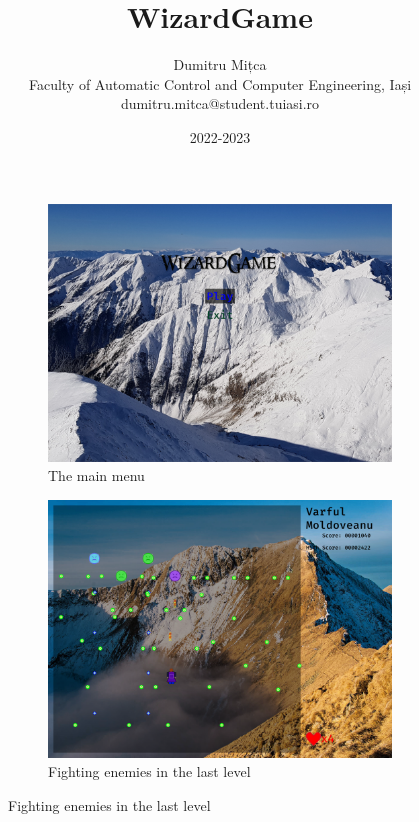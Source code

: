 \documentclass{article}
\title{\textbf{WizardGame}}
\author{
    Dumitru Mițca\\
    Faculty of Automatic Control and Computer Engineering, Iași\\
    dumitru.mitca@student.tuiasi.ro}
\date{2022-2023}
\begin{document}
    \maketitle

    \begin{figure}[h]
        \begin{subfigure}{0.5\linewidth}
            \includegraphics[width=\linewidth]{main-menu}
            \caption{The main menu}
        \end{subfigure}
        \begin{subfigure}{0.5\linewidth}
            \includegraphics[width=\linewidth]{level}
            \caption{Fighting enemies in the last level}
        \end{subfigure}
    \end{figure}
\end{document}
